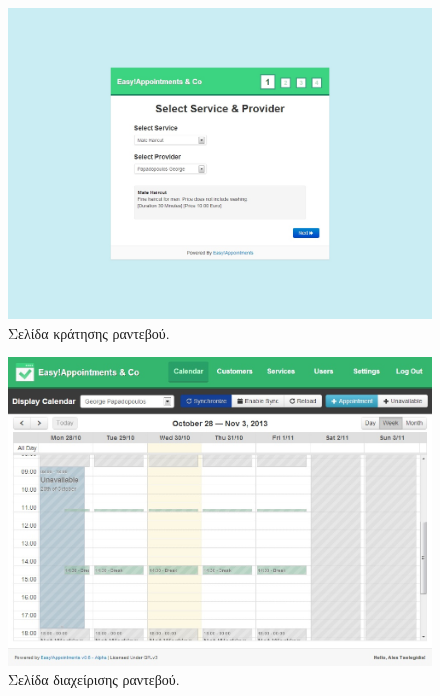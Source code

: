 \begin{figure}[ht!]
\centering
\includegraphics[width=130mm]{images/book-appointment.jpg}
\caption{Σελίδα κράτησης ραντεβού.}
\label{book-appointment}
\end{figure}

\begin{figure}[ht!]
\centering
\includegraphics[width=130mm]{images/backend-calendar.jpg}
\caption{Σελίδα διαχείρισης ραντεβού.}
\label{backend-calendar}
\end{figure}

